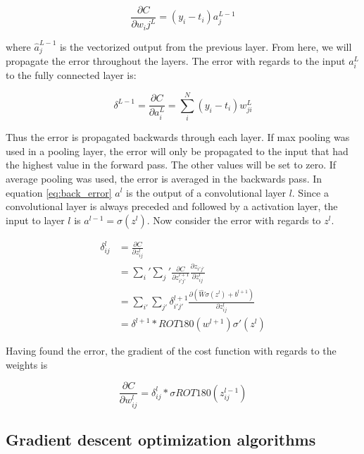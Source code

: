 \documentclass[thesis.tex]{subfiles}
\begin{document}
\begin{equation}
   \frac{\partial C}{\partial w_ij^L} = (y_i - t_i)a_j^{L-1}
\end{equation}

where $\hat{a}_{j}^{L-1}$ is the vectorized output from the previous layer. From here, we will propagate the error throughout the layers. The error with regards to the input $a_i^L$ to the fully connected layer is:

\begin{equation} %
  \delta^{L-1} = \frac{\partial C}{\partial a_i^L} = \sum_i^N (y_i - t_i)w_{ji}^{L}
  \label{eq:back_error}
\end{equation}

Thus the error is propagated backwards through each layer. If max pooling was used in a pooling layer, the error will only be propagated to the input that had the highest value in the forward pass. The other values will be set to zero. If average pooling was used, the error is averaged in the backwards pass.
In equation \ref{eq:back_error} $a^l$ is the output of a convolutional layer $l$. Since a convolutional layer is always preceded and followed by a activation layer, the input to layer $l$ is $a^{l-1} = \sigma(z^l)$. Now consider the error with regards to $z^l$.

\begin{equation}
  \begin{aligned}
  \delta_{ij}^l &= \frac{\partial C}{\partial z_{ij}^l} \\
  &= \sum_i' \sum_j' \frac{\partial C}{\partial z_{i'j'}^{l+1}}\frac{\partial z_{i'j'}}{\partial z_{ij}^l} \\
  &= \sum_{i'} \sum_{j'}\delta_{i'j'}^{l+1} \frac{\partial (\hat{W}\sigma(z^l) + b^{l+1})}{\partial z_{ij}^l} \\
  &= \delta^{l+1} * ROT180(w^{l+1})\sigma'(z^l)
  \end{aligned}
\end{equation}

Having found the error, the gradient of the cost function with regards to the weights is

\begin{equation} %
  \frac{\partial C}{\partial w_{ij}^l} = \delta_{ij}^l * \sigma{ROT180(z_{ij}^{l-1})}
\end{equation}



\subsection{Gradient descent optimization algorithms}
\end{document}
